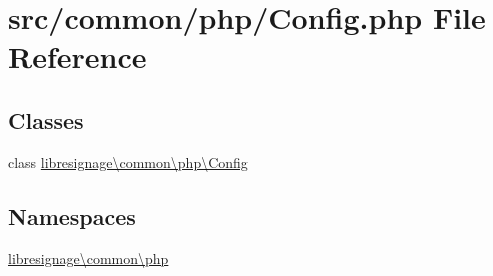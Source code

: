 \hypertarget{Config_8php}{}\section{src/common/php/\+Config.php File Reference}
\label{Config_8php}
\subsection*{Classes}
\begin{DoxyCompactItemize}
\item 
class \hyperlink{classlibresignage_1_1common_1_1php_1_1Config}{libresignage\textbackslash{}common\textbackslash{}php\textbackslash{}\+Config}
\end{DoxyCompactItemize}
\subsection*{Namespaces}
\begin{DoxyCompactItemize}
\item 
 \hyperlink{namespacelibresignage_1_1common_1_1php}{libresignage\textbackslash{}common\textbackslash{}php}
\end{DoxyCompactItemize}
